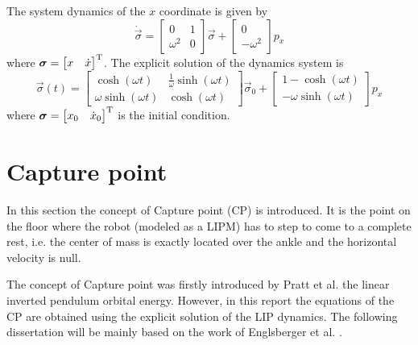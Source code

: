 \par
The system dynamics of the $x$ coordinate is given by
\begin{equation}
  \label{eq:com_dynamic_equation}
  \dot{\vec{\sigma}} =
  \begin{bmatrix}
    0 & 1 \\
    \omega ^2 &  0
  \end{bmatrix}
  \vec{\sigma} + 
  \begin{bmatrix}
    0\\
    - \omega ^2
\end{bmatrix}
p_x
\end{equation}
where $\boldsymbol{\sigma} = \begin{bmatrix} x & \dot{x} \end{bmatrix} ^{\mathrm{T}}$.
The explicit solution of the dynamics system is
\begin{equation}
  \label{eq:lipm_solution}
  \vec{\sigma}(t) =
  \begin{bmatrix}
    \cosh(\omega t) & \frac{1}{\omega} \sinh(\omega t)\\
    \omega \sinh(\omega t) & \cosh(\omega t)
  \end{bmatrix}
  \vec{\sigma}_0 + 
  \begin{bmatrix}
    1-\cosh(\omega t)\\
    - \omega \sinh(\omega t)
  \end{bmatrix}
  p_x
\end{equation}
where $\boldsymbol{\sigma} = \begin{bmatrix} x_0 & \dot{x}_0 \end{bmatrix} ^{\mathrm{T}}$ is the initial
condition.

\newpage

\section{Capture point}
In this section the concept of Capture point (CP) is introduced.
It is the point on the floor where the robot (modeled as a LIPM) has to step to come
to a complete rest, i.e. the center of mass is exactly located over the ankle and the horizontal
velocity is null.
\par
The concept of Capture point was firstly introduced by Pratt et al. \cite{Pratt2006}
the linear inverted pendulum orbital energy. However, in this report the equations of the CP are
obtained using the explicit solution of the LIP dynamics. The following dissertation will be
mainly based on the work of Englsberger et al. \cite{Englsberger2011}.

